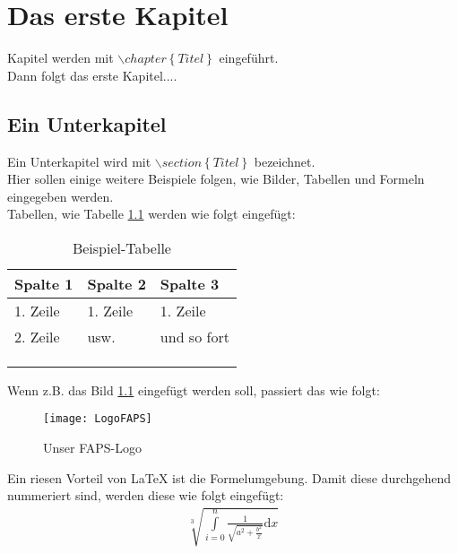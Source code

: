 \chapter{Das erste Kapitel}
\label{Kapitel_erste}
Kapitel werden mit $\backslash\!chapter\left\{ Titel \right\}$ eingeführt.\\

Dann folgt das erste Kapitel....

\section{Ein Unterkapitel}
Ein Unterkapitel wird mit $\backslash\!section\left\{ Titel \right\}$ bezeichnet.\\

Hier sollen einige weitere Beispiele folgen, wie Bilder, Tabellen und Formeln eingegeben werden.\\

Tabellen, wie Tabelle \ref{Tabelle_Beispiel} werden wie folgt eingefügt:\\
\begin{longtable}{|p{4cm}|l|p{7.1cm}|}
\caption{Beispiel-Tabelle} \label{Tabelle_Beispiel} \\
\hline
\cellcolor{hellgrau} Spalte 1 & \cellcolor{hellgrau} Spalte 2 & \cellcolor{hellgrau} Spalte 3
\\ \hline \hline
1. Zeile		&	1. Zeile		& 1. Zeile
\\ \hline
2. Zeile 		& 	usw.			& 	und so fort
\\ \hline
 		& 			&
\\ \hline
 		&			&
\\ \hline
 		&			&
\\ \hline
\end{longtable}

\pagebreak

Wenn z.B. das Bild \ref{Bild_Beispiel} eingefügt werden soll, passiert das wie
folgt:
\begin{figure}[ht!]
	\centering
 	\texttt{[image: LogoFAPS]}
	\caption{Unser FAPS-Logo}
	\label{Bild_Beispiel}
\end{figure}

Ein riesen Vorteil von \LaTeX\; ist die Formelumgebung. Damit diese durchgehend
nummeriert sind, werden diese wie folgt eingefügt:
\begin{align}
	\label{Formel_Beispiel}
	\sqrt[3]{\int \limits_{i=0}^{n} \frac{1}{\sqrt{a^2 + \frac{b^2}{x}}} \mbox{d}x}
\end{align}

